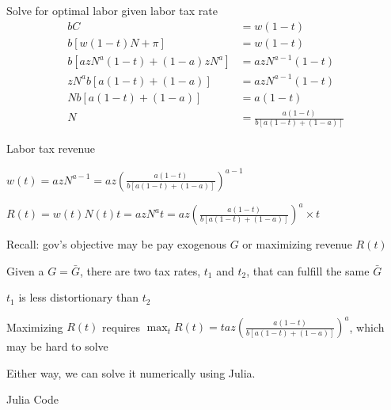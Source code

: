 \documentclass[11pt,aspectratio=169,usenames,dvipsnames]{beamer}
\let\tempone\itemize
\let\temptwo\enditemize
\renewenvironment{itemize}{\tempone\addtolength{\itemsep}{\fill}}{\temptwo}
\begin{document}
\begin{frame}{Solve for optimal labor given labor tax rate}
\label{slide:Solve_for_optimal_labor_given_labor_tax_rate}
%
\begin{align}
  b C & = w (1 - t)\\
  b [w (1 - t) N + \pi] & = w (1 - t)\\
  b [a z N^a (1 - t) + (1 - a) z N^a] & = a z N^{a - 1} (1 - t)\\
  z N^a b [a (1 - t) + (1 - a) ] & = a z N^{a - 1} (1 - t)\\
  N b [a (1 - t) + (1 - a) ] & = a (1 - t)\\
  N & = \frac{a (1 - t)}{b [a (1 - t) + (1 - a) ]}
\end{align}
%
\end{frame}

\begin{frame}{Labor tax revenue}
\label{slide:Labor_tax_revenue}
\begin{itemize}
    \item $ \displaystyle w(t) = a z N^{a - 1} = a z \left( \frac{a (1 - t)}{b [a (1 - t) + (1 - a) ]} \right)^{a - 1}$
    \item $ \displaystyle R(t) = w(t) N(t) t = a z N^{a} t = a z \left( \frac{a (1 - t)}{b [a (1 - t) + (1 - a) ]} \right)^{a} \times t $
    \item Recall: gov's objective may be \alert{pay exogenous $ G $} or \alert{maximizing revenue $ R(t) $}
    \begin{itemize}
        \item Given a $ G = \bar{G} $, there are two tax rates, $ t_{1} $ and $ t_{2} $, that can fulfill the same $ \bar{G} $
        \begin{itemize}
            \item $ t_{1} $ is less distortionary than $ t_{2} $
        \end{itemize}
        \item Maximizing $ R(t) $ requires $ \displaystyle \max_{t} R(t) = t a z \left( \frac{a (1 - t)}{b [a (1 - t) + (1 - a) ]} \right)^{a} $, which may be hard to solve
    \end{itemize}
    \item Either way, we can solve it numerically using Julia.
\end{itemize}
\end{frame}

\begin{frame}{Julia Code}
\label{slide:Julia_Code}
\tiny
\inputminted[breaklines,breakanywhere,xleftmargin=3em,linenos]{julia}{../q2.jl}
\end{frame}


%
% 
% 
\end{document}
